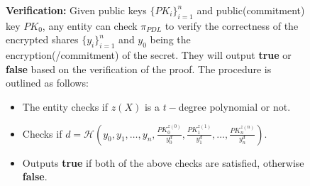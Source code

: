 \begin{figure}[ht]
{\begin{tcolorbox}[title=\textbf{$\Lambda_{RO}$ \cite{cryptoeprint:2025/576}}, width=1.2\textwidth, colframe=blue!75!black, colback=blue!10, sharp corners]
        \vspace{0.5em}
        \textbf{Verification:}
            Given public keys $\{PK_i\}_{i=1}^n$ and public(commitment) key $PK_0$, any entity can check 
            $\pi_{PDL}$ to verify the correctness of the encrypted shares $\{y_i\}_{i=1}^n$ and $y_0$ being the encryption(/commitment) of the secret. 
            They will output \textbf{true} or \textbf{false} based on the verification of the proof. The 
            procedure is outlined as follows:
        \begin{itemize}
            \item The entity checks if $z(X)$ is a $t-$degree polynomial or not.
            \item Checks if $d=\mathcal{H}(y_0,y_1,\dots,y_n,\frac{PK_0^{z(0)}}{y_0^d},\frac{PK_1^{z(1)}}{y_1^d},\dots,\frac{PK_n^{z(n)}}{y_n^d})$.
            \item Outputs \textbf{true} if both of the above checks are satisfied, otherwise \textbf{false}.
        \end{itemize}


\end{tcolorbox}}
\end{figure}
